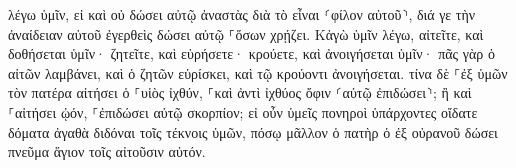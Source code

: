 \documentclass{openreader}
\begin{document}
λέγω ὑμῖν, εἰ καὶ οὐ δώσει αὐτῷ ἀναστὰς διὰ τὸ εἶναι ⸂φίλον αὐτοῦ⸃, διά γε τὴν ἀναίδειαν αὐτοῦ ἐγερθεὶς δώσει αὐτῷ ⸀ὅσων χρῄζει. 
Κἀγὼ ὑμῖν λέγω, αἰτεῖτε, καὶ δοθήσεται ὑμῖν· ζητεῖτε, καὶ εὑρήσετε· κρούετε, καὶ ἀνοιγήσεται ὑμῖν· 
πᾶς γὰρ ὁ αἰτῶν λαμβάνει, καὶ ὁ ζητῶν εὑρίσκει, καὶ τῷ κρούοντι ἀνοιγήσεται. 
τίνα δὲ ⸀ἐξ ὑμῶν τὸν πατέρα αἰτήσει ὁ ⸀υἱὸς ἰχθύν, ⸀καὶ ἀντὶ ἰχθύος ὄφιν ⸂αὐτῷ ἐπιδώσει⸃; 
ἢ καὶ ⸀αἰτήσει ᾠόν, ⸀ἐπιδώσει αὐτῷ σκορπίον; 
εἰ οὖν ὑμεῖς πονηροὶ ὑπάρχοντες οἴδατε δόματα ἀγαθὰ διδόναι τοῖς τέκνοις ὑμῶν, πόσῳ μᾶλλον ὁ πατὴρ ὁ ἐξ οὐρανοῦ δώσει πνεῦμα ἅγιον τοῖς αἰτοῦσιν αὐτόν. 
\end{document}
